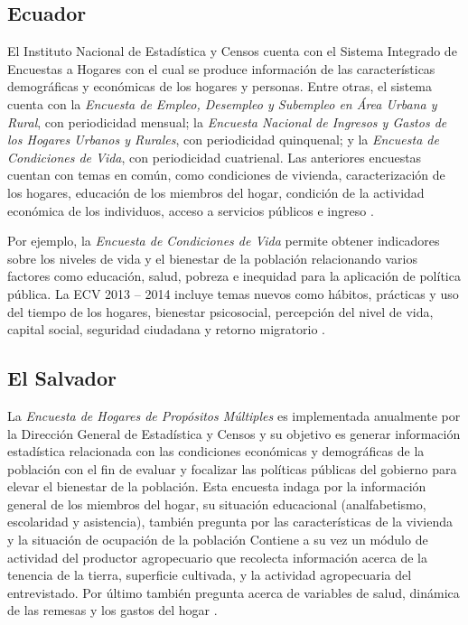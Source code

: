 \hypertarget{ecuador}{%
\subsection*{Ecuador}\label{ecuador}}


El Instituto Nacional de Estadística y Censos cuenta con el Sistema Integrado de Encuestas a Hogares con el cual se produce información de las características demográficas y económicas de los hogares y personas. Entre otras, el sistema cuenta con la \emph{Encuesta de Empleo, Desempleo y Subempleo en Área Urbana y Rural}, con periodicidad mensual; la \emph{Encuesta Nacional de Ingresos y Gastos de los Hogares Urbanos y Rurales}, con periodicidad quinquenal; y la \emph{Encuesta de Condiciones de Vida}, con periodicidad cuatrienal. Las anteriores encuestas cuentan con temas en común, como condiciones de vivienda, caracterización de los hogares, educación de los miembros del hogar, condición de la actividad económica de los individuos, acceso a servicios públicos e ingreso \citep{INEC-EC}.

Por ejemplo, la \emph{Encuesta de Condiciones de Vida} permite obtener indicadores sobre los niveles de vida y el bienestar de la población relacionando varios factores como educación, salud, pobreza e inequidad para la aplicación de política pública. La ECV 2013 -- 2014 incluye temas nuevos como hábitos, prácticas y uso del tiempo de los hogares, bienestar psicosocial, percepción del nivel de vida, capital social, seguridad ciudadana y retorno migratorio \citep{INEC2-EC}.

\hypertarget{el-salvador}{%
\subsection*{El Salvador}\label{el-salvador}}


La \emph{Encuesta de Hogares de Propósitos Múltiples} es implementada anualmente por la Dirección General de Estadística y Censos y su objetivo es generar información estadística relacionada con las condiciones económicas y demográficas de la población con el fin de evaluar y focalizar las políticas públicas del gobierno para elevar el bienestar de la población. Esta encuesta indaga por la información general de los miembros del hogar, su situación educacional (analfabetismo, escolaridad y asistencia), también pregunta por las características de la vivienda y la situación de ocupación de la población Contiene a su vez un módulo de actividad del productor agropecuario que recolecta información acerca de la tenencia de la tierra, superficie cultivada, y la actividad agropecuaria del entrevistado. Por último también pregunta acerca de variables de salud, dinámica de las remesas y los gastos del hogar \citep{DIGESTYC-SV}.

